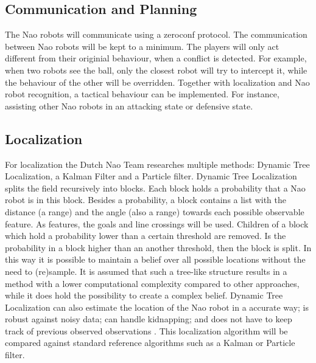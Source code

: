\documentclass[11pt]{article}
\begin{document}
\subsection{Communication and Planning}
The Nao robots will communicate using a zeroconf protocol. The  communication between Nao robots will be kept to a minimum. The players will only act different from their originial behaviour, when a conflict is detected. For example, when two robots see the ball, only the closest robot will try to intercept it, while the behaviour of the other will be overridden. Together with localization and Nao robot recognition, a tactical behaviour can be implemented. For instance, assisting other Nao robots in an attacking state or defensive state.
\subsection{Localization}
For localization the Dutch Nao Team researches multiple methods: Dynamic Tree Localization, a Kalman Filter and a Particle filter. 
Dynamic Tree Localization \cite{vdMolen2011} splits the field recursively into blocks. Each block holds a probability that a Nao robot is in this block. 
Besides a probability, a block contains a list with the distance (a range) and the angle (also a range) towards each possible observable feature. 
As features, the goals and line crossings will be used. Children of a block which hold a probability lower than a certain threshold are removed.
Is the probability in a block higher than an another threshold, then the block is split. In this way it is possible to maintain a belief over all possible locations without the need to (re)sample.
It is assumed that such a tree-like structure results in a method with a lower computational complexity compared to other approaches, while it does hold the possibility to create a complex belief. 
Dynamic Tree Localization can also estimate the location of the Nao robot in a accurate way; is robust against noisy data; can handle kidnapping; and does not have to keep track of previous observed observations \cite{vdMolen2011}.
This localization algorithm will be compared against standard reference algorithms such as a Kalman or Particle filter. 
\end{document}
